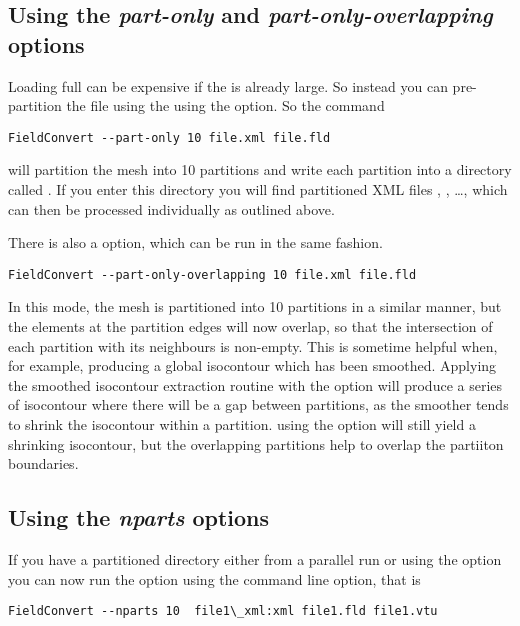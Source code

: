 \subsection{Using the \textit{ part-only} and \textit{ part-only-overlapping} options}

Loading full  can be expensive if the
 is already large. So instead you can pre-partition
the file using the using the  option. So the
command
\begin{lstlisting}[style=BashInputStyle]
FieldConvert --part-only 10 file.xml file.fld
\end{lstlisting}
will partition the mesh into 10 partitions and write each partition into a
directory called . If you enter this directory you will find
partitioned XML files , , \dots,
 which can then be processed individually as outlined above.

There is also a  option, which can be run in the
same fashion.
\begin{lstlisting}[style=BashInputStyle]
FieldConvert --part-only-overlapping 10 file.xml file.fld
\end{lstlisting}
In this mode, the mesh is partitioned into 10 partitions in a similar manner,
but the elements at the partition edges will now overlap, so that the
intersection of each partition with its neighbours is non-empty. This is
sometime helpful when, for example, producing a global isocontour which has been
smoothed. Applying the smoothed isocontour extraction routine with the
 option will produce a series of isocontour where there will
be a gap between partitions, as the smoother tends to shrink the isocontour
within a partition. using the  option will still
yield a shrinking isocontour, but the overlapping partitions help to overlap the
partiiton boundaries.

\subsection{Using the \textit{nparts} options}

If you have a partitioned directory either from a parallel run or
using the  option you can now run the
 option using the   command line
option, that is
\begin{lstlisting}[style=BashInputStyle]
FieldConvert --nparts 10  file1\_xml:xml file1.fld file1.vtu
\end{lstlisting}

